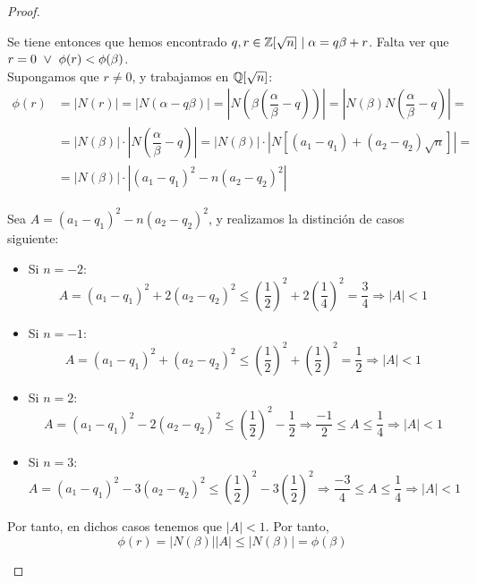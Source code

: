 \begin{proof}
\begin{enumerate}
\begin{itemize}
            Se tiene entonces que hemos encontrado $q,r \in \mathbb Z[\sqrt{n}] \mid \alpha = q\beta + r$. Falta ver que $r=0 \ \lor \  \phi(r) < \phi(\beta)$.\\

            Supongamos que $r\neq0$, y trabajamos en $\mathbb Q[\sqrt{n}]$:
            \begin{equation*}
                \begin{split}
                    \phi(r) &= |N(r)|
                    = |N(\alpha - q\beta)|
                    = \left|N\left(\beta\left( \dfrac{\alpha}{\beta} - q\right)\right)\right|
                    = \left|N(\beta) N\left( \dfrac{\alpha}{\beta}-q \right)\right| = \\
                    & = |N(\beta)|\cdot \left|N\left( \dfrac{\alpha}{\beta}-q \right)\right|
                    = |N(\beta)|\cdot |N[(a_1-q_1)+(a_2-q_2)\sqrt{n}]| =\\
                    &= |N(\beta)|\cdot |(a_1-q_1)^2-n(a_2-q_2)^2|
                \end{split}
            \end{equation*}
            
            Sea $A = (a_1-q_1)^2-n(a_2-q_2)^2$, y realizamos la distinción de casos siguiente:
            \begin{itemize}
                \item Si $n=-2$:
                $$A=(a_1-q_1)^2+2(a_2-q_2)^2 \leq \left(\dfrac{1}{2}\right)^2+2\left(\dfrac{1}{4}\right)^2 = \dfrac{3}{4} \Longrightarrow |A|<1$$

                \item Si $n=-1$:
                $$A=(a_1-q_1)^2+(a_2-q_2)^2 \leq \left(\dfrac{1}{2}\right)^2+ \left(\dfrac{1}{2}\right)^2 = \dfrac{1}{2} \Longrightarrow |A|<1$$

                \item Si $n=2$:
                $$A=(a_1-q_1)^2-2(a_2-q_2)^2 \leq \left(\dfrac{1}{2}\right)^2 - \dfrac{1}{2} \Longrightarrow \dfrac{-1}{2} \leq A \leq \dfrac{1}{4} \Longrightarrow |A|<1$$
            
                \item Si $n=3$:
                $$A=(a_1-q_1)^2-3(a_2-q_2)^2 \leq \left(\dfrac{1}{2}\right)^2 - 3\left(\dfrac{1}{2}\right)^2 \Longrightarrow \dfrac{-3}{4} \leq A \leq \dfrac{1}{4} \Longrightarrow |A|<1$$
            \end{itemize}

            Por tanto, en dichos casos tenemos que $|A|<1$. Por tanto,
            $$\phi(r) = |N(\beta)||A| \leq |N(\beta)| = \phi(\beta)$$
        \end{itemize}
    \end{enumerate}
\end{proof}

